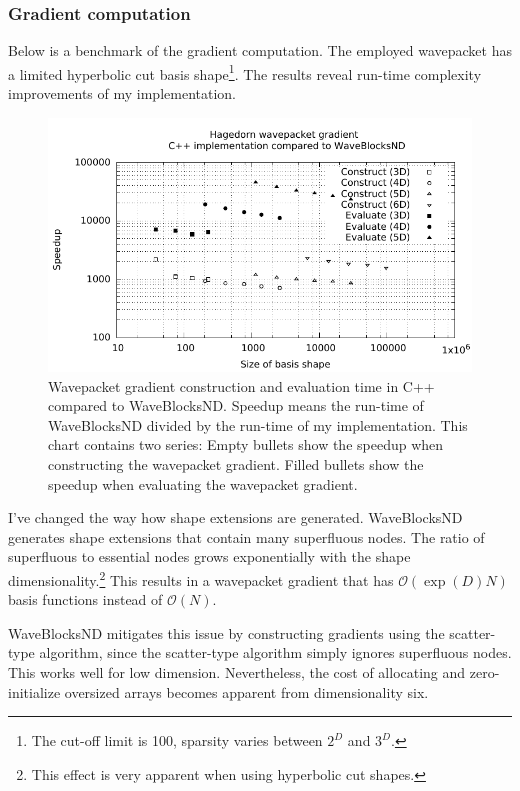 \documentclass{article}
\begin{document}
\subsubsection{Gradient computation}

Below is a benchmark of the gradient computation. The employed wavepacket
has a limited hyperbolic cut basis shape\footnote{
  The cut-off limit is 100, sparsity varies between \(2^D\) and \(3^D\).}.
The results reveal run-time complexity improvements of my implementation.

\begin{figure}[H]
  \centering
  \includegraphics[width=1.0\textwidth]{plots/grad_eval_cvp}
  \caption{
    Wavepacket gradient construction and evaluation time in C++ compared to WaveBlocksND.
    Speedup means the run-time of WaveBlocksND divided by the run-time of my implementation.
    This chart contains two series: Empty bullets show the speedup when constructing
    the wavepacket gradient. Filled bullets show the speedup when evaluating the
    wavepacket gradient.
  }
  \label{fig:grad_eval_cvp}
\end{figure}

I've changed the way how shape extensions are generated. WaveBlocksND generates
shape extensions that contain many superfluous nodes. The ratio of superfluous to
essential nodes grows exponentially with the shape
dimensionality.\footnote{This effect is very apparent when using hyperbolic cut shapes.}
This results in a wavepacket gradient that has \(\mathcal{O}(\exp{}(D) N)\) basis functions instead of
\(\mathcal{O}(N)\).

WaveBlocksND mitigates this issue by constructing gradients using the scatter-type algorithm,
since the scatter-type algorithm simply ignores superfluous nodes. This works well for low dimension.
Nevertheless, the cost of allocating and zero-initialize oversized arrays
becomes apparent from dimensionality six.
\end{document}
